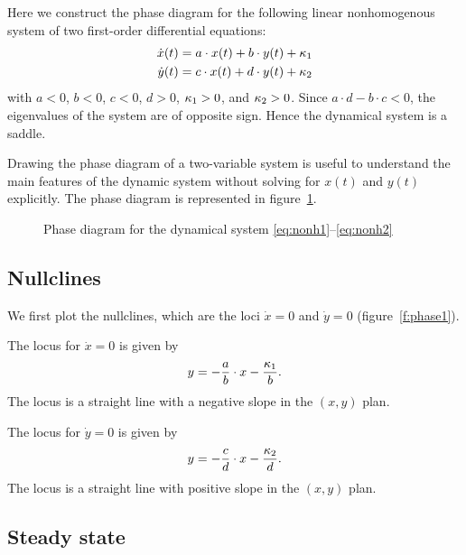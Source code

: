 \documentclass[letterpaper,12pt,leqno]{article}
\newcommand{\pdf}{phasediagrams.pdf}
\begin{document}
Here we construct the phase diagram for the following linear nonhomogenous system of two first-order differential equations:
\begin{align}
\dot{x}(t) &=a\cdot x(t)+b\cdot y(t)+\kappa_{1}\label{eq:nonh1}\\
\dot{y}(t) &=c\cdot x(t)+d\cdot y(t)+\kappa_{2}\label{eq:nonh2}
\end{align}
with $a<0$, $b<0$, $c<0$, $d>0$, $\kappa_{1}>0$, and $\kappa_{2}>0$. Since $a\cdot d-b\cdot c<0$, the eigenvalues of the system are of opposite sign. Hence the dynamical system is a saddle.

Drawing the phase diagram of a two-variable system is useful to understand the main features of the dynamic system without solving for $x(t) $ and $y(t)$ explicitly. The phase diagram is represented in figure~\ref{f:phase}.

\begin{figure}[p]
\hfill
{}\vfig
{}\hfill
{}
\caption{Phase diagram for the dynamical system \eqref{eq:nonh1}--\eqref{eq:nonh2}}
\label{f:phase}\end{figure}


\subsection{Nullclines}

We first plot the nullclines, which are the loci $\dot{x}=0$ and $\dot{y}=0$ (figure~\ref{f:phase1}). 

The locus for $\dot{x}=0$ is given by
\begin{align*}
y=-\frac{a}{b}\cdot x-\frac{\kappa_{1}}{b}.
\end{align*}
The locus is a straight line with a negative slope in the $(x,y)$ plan. 

The locus for $\dot{y}=0$ is given by
\begin{align*}
y=-\frac{c}{d}\cdot x-\frac{\kappa_{2}}{d}.
\end{align*}
The locus is a straight line with positive slope in the $(x,y)$ plan.

\subsection{Steady state}
\end{document}
